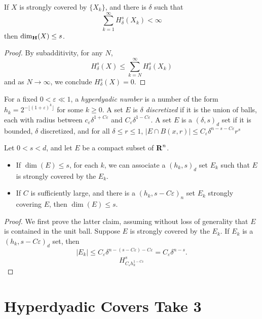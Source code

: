 \begin{theorem}
	If $X$ is strongly covered by $\{ X_k \}$, and there is $\delta$ such that
	\[ \sum_{k = 1}^\infty H^s_\delta(X_k) < \infty \]
	then $\operatorname{\dim_{\mathbf{H}}}(X) \leq s$.
\end{theorem}
\begin{proof}
	By subadditivity, for any $N$,
	\[ H^s_\delta(X) \leq \sum_{k = N}^\infty H^s_\delta(X_k) \]
	and as $N \to \infty$, we conclude $H^s_\delta(X) = 0$.
\end{proof}

For a fixed $0 < \varepsilon \ll 1$, a \emph{hyperdyadic number} is a number of the form $h_k = 2^{-\lfloor (1 + \varepsilon)^k \rfloor}$ for some $k \geq 0$. A set $E$ is \emph{$\delta$ discretized} if it is the union of balls, each with radius between $c_\varepsilon \delta^{1 + C\varepsilon}$ and $C_\varepsilon \delta^{1-C\varepsilon}$. A set $E$ is a $(\delta,s)_d$ set if it is bounded, $\delta$ discretized, and for all $\delta \leq r \leq 1$, $|E \cap B(x,r)| \leq C_\varepsilon \delta^{n-s-C\varepsilon} r^s$

\begin{lemma}
	Let $0 < s < d$, and let $E$ be a compact subset of $\operatorname{\mathbf{R}}^n$.
	\begin{itemize}
		\item If $\dim(E) \leq s$, for each $k$, we can associate a $(h_k,s)_d$ set $E_k$ such that $E$ is strongly covered by the $E_k$.

		\item If $C$ is sufficiently large, and there is a $(h_k, s - C\varepsilon)_n$ set $E_k$ strongly covering $E$, then $\dim(E) \leq s$.
	\end{itemize}
\end{lemma}
\begin{proof}
	We first prove the latter claim, assuming without loss of generality that $E$ is contained in the unit ball. Suppose $E$ is strongly covered by the $E_k$. If $E_k$ is a $(h_k,s - C\varepsilon)_d$ set, then
	\[ |E_k| \leq C_\varepsilon \delta^{n-(s-C\varepsilon)-C\varepsilon} = C_\varepsilon \delta^{n-s}. \]
	\[ H^s_{C_\varepsilon h_k^{1 - C\varepsilon}} \]
\end{proof}










\section{Hyperdyadic Covers Take 3}


